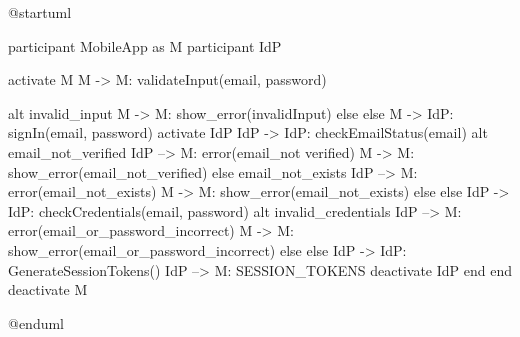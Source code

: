 @startuml

participant MobileApp as M
participant IdP

activate M
M -> M: validateInput(email, password)

alt invalid_input
M -> M: show_error(invalidInput)
else else
M -> IdP: signIn(email, password)
activate IdP
IdP -> IdP: checkEmailStatus(email)
alt email_not_verified
IdP --> M: error(email_not verified)
M -> M: show_error(email_not_verified)
else email_not_exists
IdP --> M: error(email_not_exists)
M -> M: show_error(email_not_exists)
else else
IdP -> IdP: checkCredentials(email, password)
alt invalid_credentials
IdP --> M: error(email_or_password_incorrect)
M -> M: show_error(email_or_password_incorrect)
else else
IdP -> IdP: GenerateSessionTokens()
IdP --> M: SESSION_TOKENS
deactivate IdP
end
end
deactivate M


@enduml